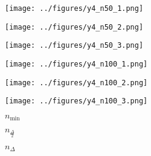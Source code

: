 \begin{otherlanguage}{ngerman}
\begin{samepage}
\begin{minipage}{\textwidth}
\begin{minipage}{0.05\textwidth}\centering{}\end{minipage}%
\begin{minipage}{0.3\textwidth}\centering\texttt{[image: ../figures/y4\_n50\_1.png]}\end{minipage}%
\begin{minipage}{0.3\textwidth}\centering\texttt{[image: ../figures/y4\_n50\_2.png]}\end{minipage}%
\begin{minipage}{0.3\textwidth}\centering\texttt{[image: ../figures/y4\_n50\_3.png]}\end{minipage}

\vspace{0.125cm}

\begin{minipage}{0.05\textwidth}\centering{}\end{minipage}%
\begin{minipage}{0.3\textwidth}\centering\texttt{[image: ../figures/y4\_n100\_1.png]}\end{minipage}%
\begin{minipage}{0.3\textwidth}\centering\texttt{[image: ../figures/y4\_n100\_2.png]}\end{minipage}%
\begin{minipage}{0.3\textwidth}\centering\texttt{[image: ../figures/y4\_n100\_3.png]}\end{minipage}

\label{fig:matrix_plot_gauss}

\begin{minipage}{0.05\textwidth}\vspace{0.5cm}\end{minipage}%
\begin{minipage}{0.3\textwidth}\centering \textbf{$n_{\mathrm{min}}$}\end{minipage}%
\begin{minipage}{0.3\textwidth}\centering \textbf{$n_{\frac{\Delta}{2}}$}\end{minipage}%
\begin{minipage}{0.3\textwidth}\centering \textbf{$n_{\Delta}$}\end{minipage}


\end{minipage}
\end{samepage}
\end{otherlanguage}
